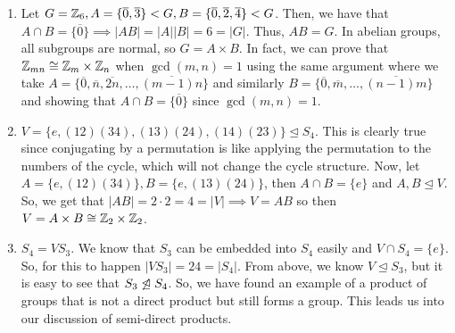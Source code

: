 \documentclass[11pt,leqno,oneside]{amsart}
\newcommand{\subgroup}{\mathrel{<}}
\newcommand{\normsubgroup}{\mathrel{\unlhd}}
\newcommand{\isom}{\mathrel{\cong}}
\begin{document}
\begin{example}
    \begin{enumerate}[label=(\alph*)]
        \item Let $G = \Z_6, A = \{\overline{0}, \overline{3}\} \subgroup G, B
            = \{\overline{0}, \overline{2}, \overline{4}\} \subgroup G$. Then,
            we have that $A \cap B = \{ \overline{0} \} \implies |AB|=|A||B| =
            6 = |G|$. Thus, $AB = G$. In abelian groups, all subgroups are
            normal, so $G = A \times B$. In fact, we can prove that $\Z_{mn}
            \isom \Z_m \times \Z_n$ when $\gcd(m,n) = 1$ using the same
            argument where we take $A = \{\overline{0}, \overline{n},
            \overline{2n}, \ldots, \overline{(m-1)n}\}$ and similarly $B =
            \{\overline{0}, \overline{m}, \ldots, \overline{(n-1)m}\}$ and
            showing that $A \cap B = \{\overline{0}\}$ since $\gcd(m,n) = 1$.
        \item $V = \{e, (12)(34), (13)(24), (14)(23)\} \normsubgroup S_4$. This
            is clearly true since conjugating by a permutation is like applying
            the permutation to the numbers of the cycle, which will not change
            the cycle structure. Now, let $A = \{e, (12)(34)\}, B = \{e, (13)(24)\}$, then $A \cap B = \{e\}$ and $A,B \normsubgroup V$. So,
            we get that $|AB| = 2\cdot 2 = 4 = |V| \implies V = AB$ so then $V
            = A \times B \isom \Z_2 \times \Z_2$.
        \item $S_4 = VS_3$. We know that $S_3$ can be embedded into $S_4$
            easily and $V \cap S_4 = \{e\}$. So, for this to happen $|VS_3| =
            24 = |S_4|$. From above, we know $V \normsubgroup S_3$, but it is
            easy to see that $S_3 \not\normsubgroup S_4$. So, we have found an
            example of a product of groups that is not a direct product but
            still forms a group. This leads us into our discussion of
            semi-direct products.
    \end{enumerate}
\end{example}
\end{document}
